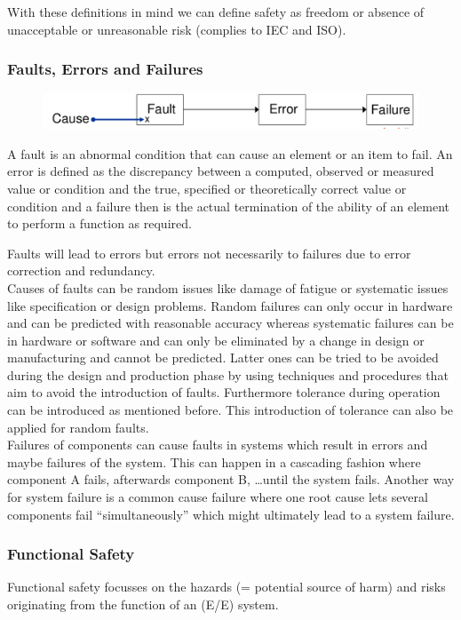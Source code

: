With these definitions in mind we can define safety as freedom or absence of unacceptable or unreasonable risk (complies to IEC and ISO).

\subsubsection*{Faults, Errors and Failures}
\begin{figure}[H]
  \centering
  \includegraphics[width=.8\textwidth]{images/fault_error_failure.png}
\end{figure}
A fault is an abnormal condition that can cause an element or an item to fail.
An error is defined as the discrepancy between a computed, observed or measured value or condition and the true, specified or theoretically correct value or condition and a failure then is the actual termination of the ability of an element to perform a function as required.

Faults will lead to errors but errors not necessarily to failures due to error correction and redundancy.\\
Causes of faults can be random issues like damage of fatigue or systematic issues like specification or design problems.
Random failures can only occur in hardware and can be predicted with reasonable accuracy whereas systematic failures can be in hardware or software and can only be eliminated by a change in design or manufacturing and cannot be predicted.
Latter ones can be tried to be avoided during the design and production phase by using techniques and procedures that aim to avoid the introduction of faults.
Furthermore tolerance during operation can be introduced as mentioned before.
This introduction of tolerance can also be applied for random faults.\\

Failures of components can cause faults in systems which result in errors and maybe failures of the system.
This can happen in a cascading fashion where component A fails, afterwards component B, \ldots until the system fails.
Another way for system failure is a common cause failure where one root cause lets several components fail ``simultaneously'' which might ultimately lead to a system failure.

\subsubsection*{Functional Safety}
Functional safety focusses on the hazards (= potential source of harm) and risks originating from the function of an (E/E) system.

